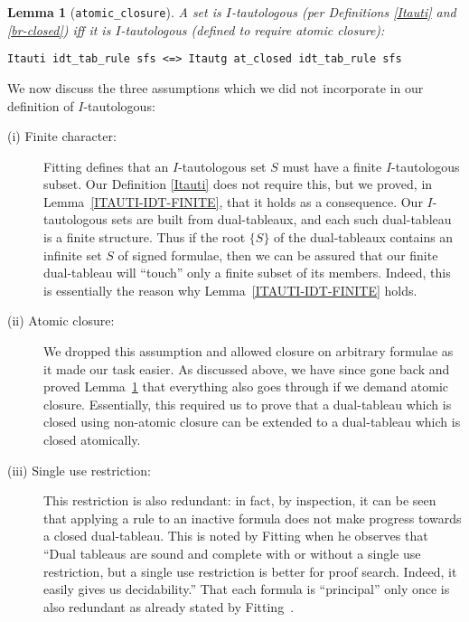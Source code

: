 \documentclass[a4paper]{article}
\newtheorem{lemma}{Lemma}
\begin{document}
\begin{lemma}[\texttt{atomic\_closure}]\label{atomic-closure}
A set is $I$-tautologous (per Definitions \ref{Itauti} and \ref{br-closed})
iff it is $I$-tautologous (defined to require atomic closure):
\end{lemma}
\begin{verbatim}
Itauti idt_tab_rule sfs <=> Itautg at_closed idt_tab_rule sfs 
\end{verbatim}

We now discuss the three assumptions which we did not incorporate
in our definition of $I$-tautologous:
\begin{description}
\item[\rm (i) Finite character:] Fitting defines that an $I$-tautologous
  set $S$ must have a finite $I$-tautologous subset.
  Our Definition \ref{Itauti} does not require this, but we proved,
  in Lemma~\ref{ITAUTI-IDT-FINITE}, that it holds as a consequence.
  Our $I$-tautologous sets are built from dual-tableaux, and each
  such dual-tableau is a finite structure. Thus if the root $\{S\}$ of the
  dual-tableaux contains an infinite set $S$ of signed formulae, then we
  can be assured that our finite dual-tableau will ``touch'' only a
  finite subset of its members. Indeed, this is essentially the reason
  why Lemma~\ref{ITAUTI-IDT-FINITE} holds.
\item[\rm (ii) Atomic closure:] We dropped this assumption and allowed
  closure on arbitrary formulae as it made our task easier.
  As discussed above, we have
  since gone back and proved Lemma~\ref{atomic-closure} that
  everything also goes through if we demand atomic
  closure. Essentially, this required us to prove that a dual-tableau
  which is closed using non-atomic closure can be extended to a
  dual-tableau which is closed atomically.
\item[\rm (iii) Single use restriction:] This restriction is also
  redundant: in fact, by inspection, it can be seen that applying a
  rule to an inactive formula does not make progress towards a closed
  dual-tableau.  This is noted by Fitting when he observes that ``Dual
  tableaus are sound and complete with or without a single use
  restriction, but a single use restriction is better for proof
  search. Indeed, it easily gives us decidability.''  That each
  formula is ``principal'' only once is also redundant as already
  stated by Fitting~\cite[just after his Definition~2]{fitting-dual-tableau}.
\end{description}
\end{document}

